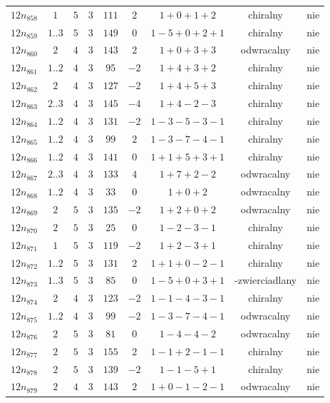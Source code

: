 \begin{longtable}{ccccccccc}
$12n_{858}$ & $1$ & $5$ & $3$ & $111$ & $2$ & $1+0+1+2$ & chiralny & nie \\
$12n_{859}$ & $1..3$ & $5$ & $3$ & $149$ & $0$ & $1-5+0+2+1$ & chiralny & nie \\
$12n_{860}$ & $2$ & $4$ & $3$ & $143$ & $2$ & $1+0+3+3$ & odwracalny & nie \\
$12n_{861}$ & $1..2$ & $4$ & $3$ & $95$ & $-2$ & $1+4+3+2$ & chiralny & nie \\
$12n_{862}$ & $2$ & $4$ & $3$ & $127$ & $-2$ & $1+4+5+3$ & chiralny & nie \\
$12n_{863}$ & $2..3$ & $4$ & $3$ & $145$ & $-4$ & $1+4-2-3$ & chiralny & nie \\
$12n_{864}$ & $1..2$ & $4$ & $3$ & $131$ & $-2$ & $1-3-5-3-1$ & chiralny & nie \\
$12n_{865}$ & $1..2$ & $4$ & $3$ & $99$ & $2$ & $1-3-7-4-1$ & chiralny & nie \\
$12n_{866}$ & $1..2$ & $4$ & $3$ & $141$ & $0$ & $1+1+5+3+1$ & chiralny & nie \\
$12n_{867}$ & $2..3$ & $4$ & $3$ & $133$ & $4$ & $1+7+2-2$ & odwracalny & nie \\
$12n_{868}$ & $1..2$ & $4$ & $3$ & $33$ & $0$ & $1+0+2$ & odwracalny & nie \\
$12n_{869}$ & $2$ & $5$ & $3$ & $135$ & $-2$ & $1+2+0+2$ & odwracalny & nie \\
$12n_{870}$ & $2$ & $5$ & $3$ & $25$ & $0$ & $1-2-3-1$ & chiralny & nie \\
$12n_{871}$ & $1$ & $5$ & $3$ & $119$ & $-2$ & $1+2-3+1$ & chiralny & nie \\
$12n_{872}$ & $1..2$ & $5$ & $3$ & $131$ & $2$ & $1+1+0-2-1$ & chiralny & nie \\
$12n_{873}$ & $1..3$ & $5$ & $3$ & $85$ & $0$ & $1-5+0+3+1$ & -zwierciadlany & nie \\
$12n_{874}$ & $2$ & $4$ & $3$ & $123$ & $-2$ & $1-1-4-3-1$ & chiralny & nie \\
$12n_{875}$ & $1..2$ & $4$ & $3$ & $99$ & $-2$ & $1-3-7-4-1$ & odwracalny & nie \\
$12n_{876}$ & $2$ & $5$ & $3$ & $81$ & $0$ & $1-4-4-2$ & odwracalny & nie \\
$12n_{877}$ & $2$ & $5$ & $3$ & $155$ & $2$ & $1-1+2-1-1$ & chiralny & nie \\
$12n_{878}$ & $2$ & $5$ & $3$ & $139$ & $-2$ & $1-1-5+1$ & chiralny & nie \\
$12n_{879}$ & $2$ & $4$ & $3$ & $143$ & $2$ & $1+0-1-2-1$ & odwracalny & nie \\

\end{longtable}
